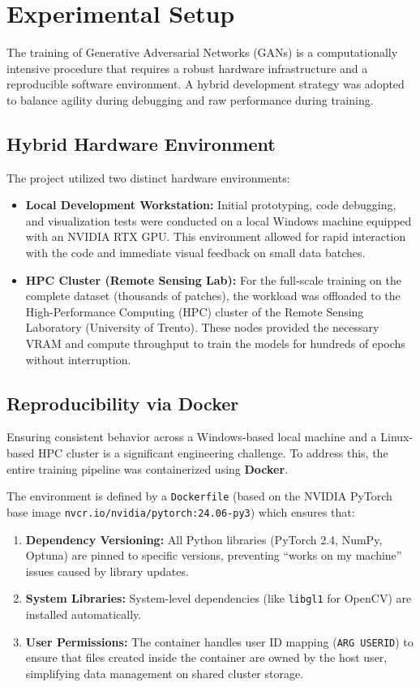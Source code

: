 \section{Experimental Setup}
\label{sec:experimental_setup_chap5}

The training of Generative Adversarial Networks (GANs) is a computationally intensive procedure that requires a robust hardware infrastructure and a reproducible software environment.
A hybrid development strategy was adopted to balance agility during debugging and raw performance during training.

\subsection{Hybrid Hardware Environment}
 The project utilized two distinct hardware environments:
 \begin{itemize}
     \item \textbf{Local Development Workstation:} Initial prototyping, code debugging, and visualization tests were conducted on a local Windows machine equipped with an NVIDIA RTX GPU. This environment allowed for rapid interaction with the code and immediate visual feedback on small data batches.
     \item \textbf{HPC Cluster (Remote Sensing Lab):} For the full-scale training on the complete dataset (thousands of patches), the workload was offloaded to the High-Performance Computing (HPC) cluster of the Remote Sensing Laboratory (University of Trento). These nodes provided the necessary VRAM and compute throughput to train the models for hundreds of epochs without interruption.
 \end{itemize}

\subsection{Reproducibility via Docker}
Ensuring consistent behavior across a Windows-based local machine and a Linux-based HPC cluster is a significant engineering challenge.
To address this, the entire training pipeline was containerized using \textbf{Docker}.

The environment is defined by a \texttt{Dockerfile} (based on the NVIDIA PyTorch base image \texttt{nvcr.io/nvidia/pytorch:24.06-py3}) which ensures that:
\begin{enumerate}
    \item \textbf{Dependency Versioning:} All Python libraries (PyTorch 2.4, NumPy, Optuna) are pinned to specific versions, preventing \enquote{works on my machine} issues caused by library updates.
    \item \textbf{System Libraries:} System-level dependencies (like \texttt{libgl1} for OpenCV) are installed automatically.
    \item \textbf{User Permissions:} The container handles user ID mapping (\texttt{ARG USERID}) to ensure that files created inside the container are owned by the host user, simplifying data management on shared cluster storage.
\end{enumerate}

